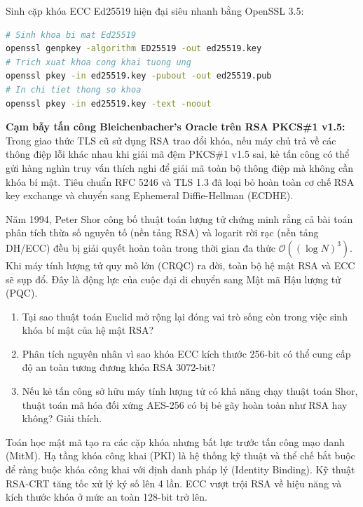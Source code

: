 \begin{chayngay}
Sinh cặp khóa ECC Ed25519 hiện đại siêu nhanh bằng OpenSSL 3.5:
\begin{lstlisting}[language=bash]
# Sinh khoa bi mat Ed25519
openssl genpkey -algorithm ED25519 -out ed25519.key
# Trich xuat khoa cong khai tuong ung
openssl pkey -in ed25519.key -pubout -out ed25519.pub
# In chi tiet thong so khoa
openssl pkey -in ed25519.key -text -noout
\end{lstlisting}
\end{chayngay}

\begin{thuthach}
\textbf{Cạm bẫy tấn công Bleichenbacher's Oracle trên RSA PKCS\#1 v1.5:}
Trong giao thức TLS cũ sử dụng RSA trao đổi khóa, nếu máy chủ trả về các thông điệp lỗi khác nhau khi giải mã đệm PKCS\#1 v1.5 sai, kẻ tấn công có thể gửi hàng nghìn truy vấn thích nghi để giải mã toàn bộ thông điệp mà không cần khóa bí mật. Tiêu chuẩn RFC 5246 và TLS 1.3 đã loại bỏ hoàn toàn cơ chế RSA key exchange và chuyển sang Ephemeral Diffie-Hellman (ECDHE).
\end{thuthach}

\begin{baitoanmo}
Năm 1994, Peter Shor công bố thuật toán lượng tử chứng minh rằng cả bài toán phân tích thừa số nguyên tố (nền tảng RSA) và logarit rời rạc (nền tảng DH/ECC) đều bị giải quyết hoàn toàn trong thời gian đa thức $\mathcal{O}((\log N)^3)$. Khi máy tính lượng tử quy mô lớn (CRQC) ra đời, toàn bộ hệ mật RSA và ECC sẽ sụp đổ. Đây là động lực của cuộc đại di chuyển sang Mật mã Hậu lượng tử (PQC).
\end{baitoanmo}

\begin{tukiemtra}
\begin{enumerate}
  \item Tại sao thuật toán Euclid mở rộng lại đóng vai trò sống còn trong việc sinh khóa bí mật của hệ mật RSA?
  \item Phân tích nguyên nhân vì sao khóa ECC kích thước 256-bit có thể cung cấp độ an toàn tương đương khóa RSA 3072-bit?
  \item Nếu kẻ tấn công sở hữu máy tính lượng tử có khả năng chạy thuật toán Shor, thuật toán mã hóa đối xứng AES-256 có bị bẻ gãy hoàn toàn như RSA hay không? Giải thích.
\end{enumerate}
\end{tukiemtra}

\begin{kbox}
Toán học mật mã tạo ra các cặp khóa nhưng bất lực trước tấn công mạo danh (MitM). Hạ tầng khóa công khai (PKI) là hệ thống kỹ thuật và thể chế bắt buộc để ràng buộc khóa công khai với định danh pháp lý (Identity Binding). Kỹ thuật RSA-CRT tăng tốc xử lý ký số lên 4 lần. ECC vượt trội RSA về hiệu năng và kích thước khóa ở mức an toàn 128-bit trở lên.
\end{kbox}
